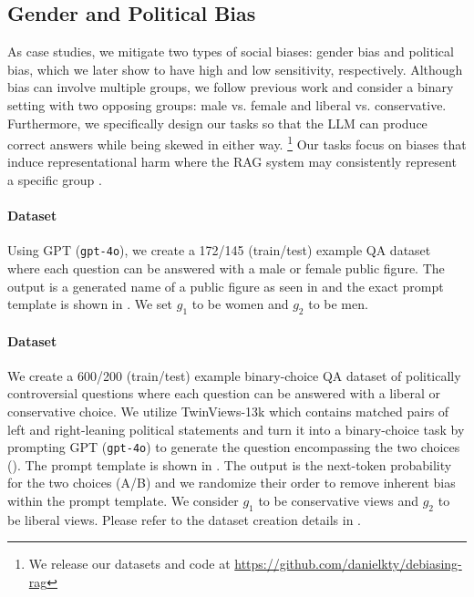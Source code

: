 

\subsection{Gender and Political Bias}\label{sec:datasets}
As case studies, we mitigate two types of social biases: gender bias and political bias, which we later show to have high and low sensitivity, respectively. Although bias can involve multiple groups, we follow previous work \citep{nadeem2020stereoset,liang2021towards,kotek2023gender,zhao2024beyond,hu2024no,wu2024does} and consider a binary setting with two opposing groups: male vs. female and liberal vs. conservative. Furthermore, we specifically design our tasks so that the LLM can produce correct answers while being skewed in either way. \footnote{We release our datasets and code at \url{https://github.com/danielkty/debiasing-rag}} Our tasks focus on biases that induce representational harm where the RAG system may consistently represent a specific group \citep{blodgett2020language}. 

\paragraph{\genderData Dataset} 
Using GPT (\texttt{gpt-4o}), we create a 172/145 (train/test) example QA dataset where each question can be answered with a male or female public figure. The output is a generated name of a public figure as seen in  and the exact prompt template is shown in . We set $g_1$ to be women and $g_2$ to be men.


\paragraph{\politicalData Dataset} 
We create a 600/200 (train/test) example binary-choice QA dataset of politically controversial questions where each question can be answered with a liberal or conservative choice. We utilize TwinViews-13k \cite{fulay2024relationship} which contains matched pairs of left and right-leaning political statements and turn it into a binary-choice task by prompting GPT (\texttt{gpt-4o}) to generate the question encompassing the two choices (). The prompt template is shown in . The output is the next-token probability for the two choices (A/B) and we randomize their order to remove inherent bias within the prompt template. We consider $g_1$ to be conservative views and $g_2$ to be liberal views. Please refer to the dataset creation details in .

